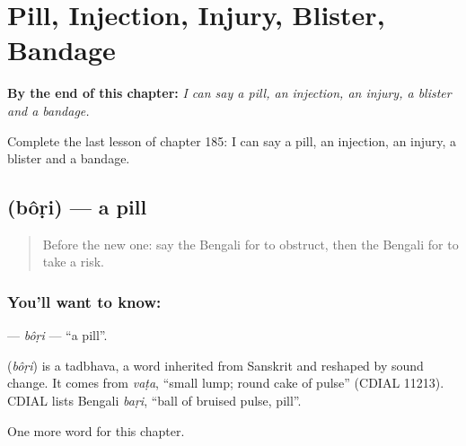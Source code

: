 
\chapter{Pill, Injection, Injury, Blister, Bandage}
\label{ch:bn-pill-injection-injury-blister-bandage}

\begin{chapteropening}
\textbf{By the end of this chapter:} \emph{I can say a pill, an injection, an injury, a blister and a bandage.}

Complete the last lesson of chapter 185: I can say a pill, an injection, an injury, a blister and a bandage.
\end{chapteropening}

\section[\texorpdfstring{\bn{বড়ি} (bôṛi)}{বড়ি (bôṛi)}]{ (bôṛi) — a pill}

\label{lesson:BN-C185-bori}



\begin{quote}
Before the new one: say the Bengali for to obstruct, then the Bengali for to take a risk.
\end{quote}

\subsection*{You'll want to know: }
\textbf{} — \emph{bôṛi} — \textquotedblleft{}a pill\textquotedblright{}.

\begin{cousinweb}
\textbf{} (\emph{bôṛi}) is a tadbhava, a word inherited from Sanskrit and reshaped by sound change. It comes from \emph{vaṭa}, \textquotedblleft{}small lump; round cake of pulse\textquotedblright{} (CDIAL 11213). CDIAL lists Bengali \emph{baṛi}, \textquotedblleft{}ball of bruised pulse, pill\textquotedblright{}.
\end{cousinweb}

\begin{grammarlens}[title={What you've built}]
One more word for this chapter.
\end{grammarlens}

